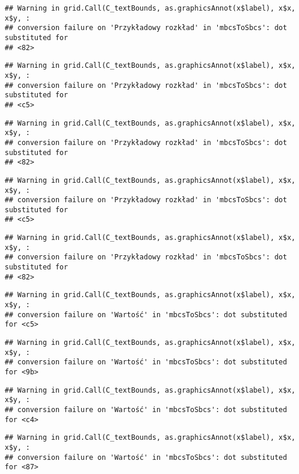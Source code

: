 \documentclass[
]{book}
\begin{document}
\begin{verbatim}
## Warning in grid.Call(C_textBounds, as.graphicsAnnot(x$label), x$x, x$y, :
## conversion failure on 'Przykładowy rozkład' in 'mbcsToSbcs': dot substituted for
## <82>
\end{verbatim}

\begin{verbatim}
## Warning in grid.Call(C_textBounds, as.graphicsAnnot(x$label), x$x, x$y, :
## conversion failure on 'Przykładowy rozkład' in 'mbcsToSbcs': dot substituted for
## <c5>
\end{verbatim}

\begin{verbatim}
## Warning in grid.Call(C_textBounds, as.graphicsAnnot(x$label), x$x, x$y, :
## conversion failure on 'Przykładowy rozkład' in 'mbcsToSbcs': dot substituted for
## <82>
\end{verbatim}

\begin{verbatim}
## Warning in grid.Call(C_textBounds, as.graphicsAnnot(x$label), x$x, x$y, :
## conversion failure on 'Przykładowy rozkład' in 'mbcsToSbcs': dot substituted for
## <c5>
\end{verbatim}

\begin{verbatim}
## Warning in grid.Call(C_textBounds, as.graphicsAnnot(x$label), x$x, x$y, :
## conversion failure on 'Przykładowy rozkład' in 'mbcsToSbcs': dot substituted for
## <82>
\end{verbatim}

\begin{verbatim}
## Warning in grid.Call(C_textBounds, as.graphicsAnnot(x$label), x$x, x$y, :
## conversion failure on 'Wartość' in 'mbcsToSbcs': dot substituted for <c5>
\end{verbatim}

\begin{verbatim}
## Warning in grid.Call(C_textBounds, as.graphicsAnnot(x$label), x$x, x$y, :
## conversion failure on 'Wartość' in 'mbcsToSbcs': dot substituted for <9b>
\end{verbatim}

\begin{verbatim}
## Warning in grid.Call(C_textBounds, as.graphicsAnnot(x$label), x$x, x$y, :
## conversion failure on 'Wartość' in 'mbcsToSbcs': dot substituted for <c4>
\end{verbatim}

\begin{verbatim}
## Warning in grid.Call(C_textBounds, as.graphicsAnnot(x$label), x$x, x$y, :
## conversion failure on 'Wartość' in 'mbcsToSbcs': dot substituted for <87>
\end{verbatim}
\end{document}
